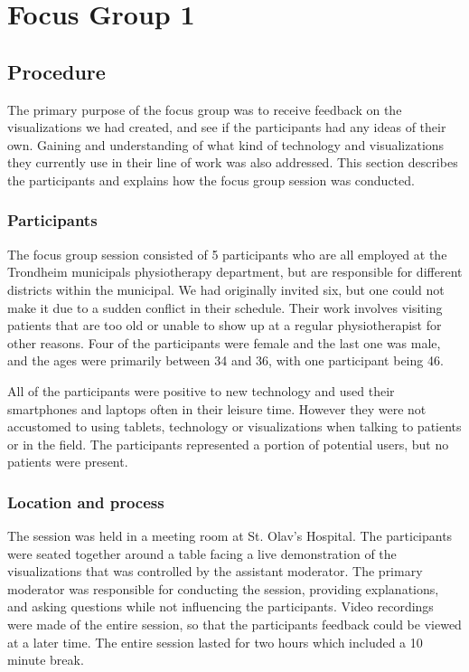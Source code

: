 \chapter{Focus Group 1}
\label{ch:focusGroup1}

\section{Procedure}
The primary purpose of the focus group was to receive feedback on the visualizations we had created, and see if the participants had any ideas of their own. Gaining and understanding of what kind of technology and visualizations they currently use in their line of work was also addressed. This section describes the participants and explains how the focus group session was conducted.

\subsection{Participants}
The focus group session consisted of 5 participants who are all employed at the Trondheim municipals physiotherapy department, but are responsible for different districts within the municipal. We had originally invited six, but one could not make it due to a sudden conflict in their schedule. Their work involves visiting patients that are too old or unable to show up at a regular physiotherapist for other reasons. Four of the participants were female and the last one was male, and the ages were primarily between 34 and 36, with one participant being 46. 

All of the participants were positive to new technology and used their smartphones and laptops often in their leisure time. However they were not accustomed to using tablets, technology or visualizations when talking to patients or in the field. The participants represented a portion of potential users, but no patients were present.

\subsection{Location and process}
The session was held in a meeting room at St. Olav's Hospital. The participants were seated together around a table facing a live demonstration of the visualizations that was controlled by the assistant moderator. The primary moderator was responsible for conducting the session, providing explanations, and asking questions while not influencing the participants. Video recordings were made of the entire session, so that the participants feedback could be viewed at a later time. The entire session lasted for two hours which included a 10 minute break.

